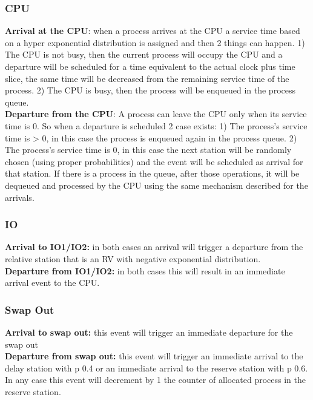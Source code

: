 \documentclass[12pt,a4paper]{article}
\begin{document}
\subsubsection{CPU}
\textbf{Arrival at the CPU}: when a process arrives at the CPU a service time based on a hyper exponential distribution is assigned and then 2 things can happen. 1) The CPU is not busy, then the current process will occupy the CPU and a departure will be scheduled for a time equivalent to the actual clock plus time slice, the same time will be decreased from the remaining service time of the process. 2) The CPU is busy, then the process will be enqueued in the process queue.
\\
\textbf{Departure from the CPU}: A process can leave the CPU only when its service time is 0. So when a departure is scheduled 2 case exists: 1) The process's service time is > 0, in this case the process is enqueued again in the process queue. 2) The process's service time is 0, in this case the next station will be randomly chosen (using proper probabilities) and the event will be scheduled as arrival for that station. If there is a process in the queue, after those operations, it will be dequeued and processed by the CPU using the same mechanism described for the arrivals.

\subsubsection{IO}

\textbf{Arrival to IO1/IO2:} in both cases an arrival will trigger a departure from the relative station that is an RV with negative exponential distribution.
\\
\textbf{Departure from IO1/IO2:} in both cases this will result in an immediate arrival event to the CPU.

\subsubsection{Swap Out}
\textbf{Arrival to swap out:} this event will trigger an immediate departure for the swap out
\\
\textbf{Departure from swap out:} this event will trigger an immediate arrival to the delay station with p 0.4 or an immediate arrival to the reserve station with p 0.6. In any case this event will decrement by 1 the counter of allocated process in the reserve station.
\end{document}
